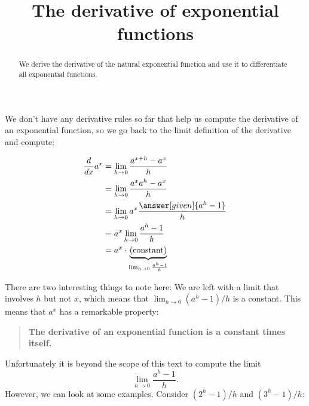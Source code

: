 \documentclass{ximera}
\title{The derivative of exponential functions}
\begin{document}
\begin{abstract}
  We derive the derivative of the natural exponential function and use it to differentiate all exponential functions.
\end{abstract}
\maketitle

We don't have any derivative rules so far that help us compute the derivative of an exponential function, so we go back to the limit definition of the derivative and compute:
\begin{explanation}
\begin{align*}
\ddx a^x &=\lim_{h\to 0} \frac{a^{x+h}-a^x}{h} \\
&=\lim_{h\to 0} \frac{a^xa^{h}-a^x}{h} \\
&=\lim_{h\to 0} a^x\frac{\answer[given]{a^{h}-1}}{h} \\
&=a^x\lim_{h\to 0} \frac{a^{h}-1}{h} \\
&=a^x \cdot \underbrace{\text{(constant)}}_{\lim_{h\to 0} \frac{a^{h}-1}{h}}
\end{align*}
\end{explanation}
There are two interesting things to note here: We are left with a
limit that involves $h$ but not $x$, which means that $
\lim_{h\to 0} (a^h-1)/h$ is a constant. This means that $a^x$ has a remarkable property:
\begin{quote}
  \textbf{The derivative of an exponential function is a constant
    times itself.}
\end{quote}
Unfortunately it is beyond the scope of this text to compute the limit
\[
\lim_{h\to 0} \frac{a^h-1}{h}.
\]
However, we can look at some examples. Consider $(2^h-1)/h$ and $(3^h-1)/h$:
\end{document}

